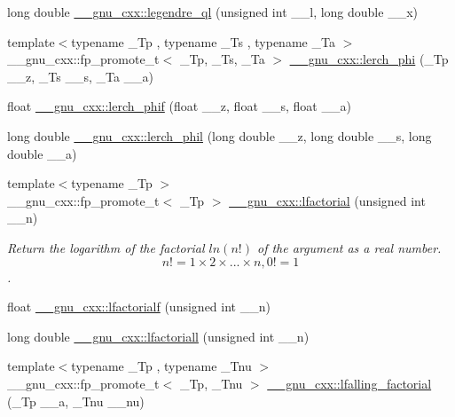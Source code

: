 \begin{DoxyCompactItemize}
\item 
long double \hyperlink{group__gnu__math__spec__func_ga60feac5a8bd733abee6610adf15208f2}{\+\_\+\+\_\+gnu\+\_\+cxx\+::legendre\+\_\+ql} (unsigned int \+\_\+\+\_\+l, long double \+\_\+\+\_\+x)
\item 
{\footnotesize template$<$typename \+\_\+\+Tp , typename \+\_\+\+Ts , typename \+\_\+\+Ta $>$ }\\\+\_\+\+\_\+gnu\+\_\+cxx\+::fp\+\_\+promote\+\_\+t$<$ \+\_\+\+Tp, \+\_\+\+Ts, \+\_\+\+Ta $>$ \hyperlink{group__gnu__math__spec__func_ga31d7cfc601a99d72e58f654d0c890fd6}{\+\_\+\+\_\+gnu\+\_\+cxx\+::lerch\+\_\+phi} (\+\_\+\+Tp \+\_\+\+\_\+z, \+\_\+\+Ts \+\_\+\+\_\+s, \+\_\+\+Ta \+\_\+\+\_\+a)
\item 
float \hyperlink{group__gnu__math__spec__func_ga90ae3ca570b08b3f458aa83ec2759be3}{\+\_\+\+\_\+gnu\+\_\+cxx\+::lerch\+\_\+phif} (float \+\_\+\+\_\+z, float \+\_\+\+\_\+s, float \+\_\+\+\_\+a)
\item 
long double \hyperlink{group__gnu__math__spec__func_gab975fa919ede92ec176330809c16c8d5}{\+\_\+\+\_\+gnu\+\_\+cxx\+::lerch\+\_\+phil} (long double \+\_\+\+\_\+z, long double \+\_\+\+\_\+s, long double \+\_\+\+\_\+a)
\item 
{\footnotesize template$<$typename \+\_\+\+Tp $>$ }\\\+\_\+\+\_\+gnu\+\_\+cxx\+::fp\+\_\+promote\+\_\+t$<$ \+\_\+\+Tp $>$ \hyperlink{group__gnu__math__spec__func_gab256f8d7b77b9a8fefafca21827166eb}{\+\_\+\+\_\+gnu\+\_\+cxx\+::lfactorial} (unsigned int \+\_\+\+\_\+n)
\begin{DoxyCompactList}\small\item\em Return the logarithm of the factorial $ ln(n!) $ of the argument as a real number. \[ n! = 1 \times 2 \times ... \times n, 0! = 1 \]. \end{DoxyCompactList}\item 
float \hyperlink{group__gnu__math__spec__func_ga65af05c4093d4895a564a8d67e389a9b}{\+\_\+\+\_\+gnu\+\_\+cxx\+::lfactorialf} (unsigned int \+\_\+\+\_\+n)
\item 
long double \hyperlink{group__gnu__math__spec__func_ga3a0c196f34916dc68c29c89f26cbe1ee}{\+\_\+\+\_\+gnu\+\_\+cxx\+::lfactoriall} (unsigned int \+\_\+\+\_\+n)
\item 
{\footnotesize template$<$typename \+\_\+\+Tp , typename \+\_\+\+Tnu $>$ }\\\+\_\+\+\_\+gnu\+\_\+cxx\+::fp\+\_\+promote\+\_\+t$<$ \+\_\+\+Tp, \+\_\+\+Tnu $>$ \hyperlink{group__gnu__math__spec__func_ga2032c10640d5010666d60d9faec86c32}{\+\_\+\+\_\+gnu\+\_\+cxx\+::lfalling\+\_\+factorial} (\+\_\+\+Tp \+\_\+\+\_\+a, \+\_\+\+Tnu \+\_\+\+\_\+nu)

\end{DoxyCompactItemize}
